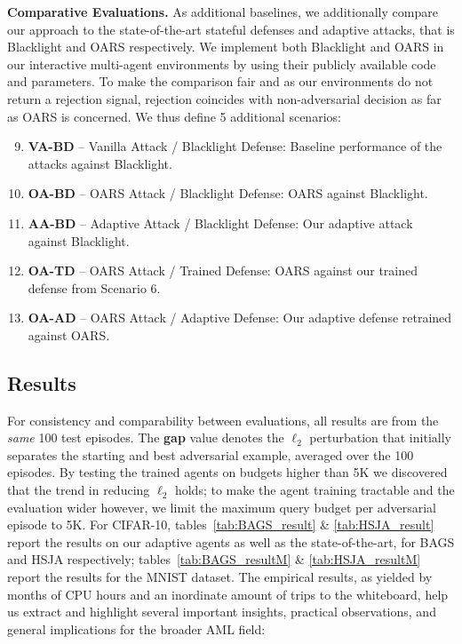 \textbf{Comparative Evaluations.} As additional baselines, we additionally compare our approach to the state-of-the-art stateful defenses and adaptive attacks, that is Blacklight \cite{li2022blacklight} and OARS \cite{feng2023stateful} respectively.
We implement both Blacklight and OARS in our interactive multi-agent environments by using their publicly available code and parameters.
To make the comparison fair and as our environments do not return a rejection signal, rejection coincides with non-adversarial decision as far as OARS is concerned.
We thus define 5 additional scenarios:

\begin{enumerate}[leftmargin=*]
\setcounter{enumi}{8} 
    \setlength\itemsep{0.1em}
    \item \textbf{VA-BD} -- Vanilla Attack / Blacklight Defense: Baseline performance of the attacks against Blacklight.
    \item \textbf{OA-BD} -- OARS Attack / Blacklight Defense: OARS against Blacklight.
    \item \textbf{AA-BD} -- Adaptive Attack / Blacklight Defense: Our adaptive attack against Blacklight.
    \item \textbf{OA-TD} -- OARS Attack / Trained Defense: OARS against our trained defense from Scenario 6.
    \item \textbf{OA-AD} -- OARS Attack / Adaptive Defense: Our adaptive defense retrained against OARS.
\end{enumerate}


\subsection{Results}
For consistency and comparability between evaluations, all results are from the \emph{same} 100 test episodes.
The \textbf{gap} value denotes the $\ell_2$ perturbation that initially separates the starting and best adversarial example, averaged over the 100 episodes. 
By testing the trained agents on budgets higher than 5K we discovered that the trend in reducing $\ell_2$ holds; to make the agent training tractable and the evaluation wider however, we limit the maximum query budget per adversarial episode to 5K.
For CIFAR-10, tables~\ref{tab:BAGS_result} \& \ref{tab:HSJA_result} report the results on our adaptive agents as well as the state-of-the-art, for BAGS and HSJA respectively; tables~\ref{tab:BAGS_resultM} \& \ref{tab:HSJA_resultM} report the results for the MNIST dataset. 
The empirical results, as yielded by months of CPU hours and an inordinate amount of trips to the whiteboard, 
help us extract and highlight several important insights, practical observations, and general implications for the broader \gls{AML} field:

